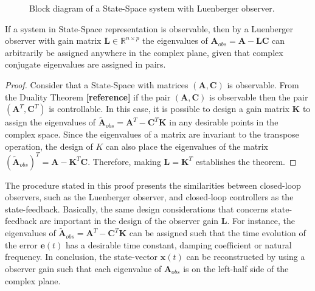 \documentclass[a4paper,11pt]{book}
\numberwithin{figure}{chapter}
\numberwithin{equation}{chapter}
\numberwithin{table}{chapter}
\newtheorem{theorem}{Theorem}[chapter]
\theoremstyle{definition}
\newcounter{boxed-theorem}
\newenvironment{boxed-theorem}[1]
{\begin{shaded} \begin{theorem}{#1}}
{\end{theorem} \end{shaded}}
\newcounter{boxed-definition}
\begin{document}
\begin{figure}[ht]
{ 
    }
    \caption{Block diagram of a State-Space system with Luenberger observer.}
    \label{fig:luenberger01}
\end{figure}

\begin{boxed-theorem}
    If a system in State-Space representation is observable, then by a Luenberger observer with gain matrix $\bm{L} \in \mathbb{R}^{n \times p}$ the eigenvalues of $\bm{A}_{obs} = \bm{A} - \bm{L} \bm{C}$ can arbitrarily be assigned anywhere in the complex plane, given that complex conjugate eigenvalues are assigned in pairs.
\end{boxed-theorem} 

\begin{proof}
    Consider that a State-Space with matrices $(\bm{A}, \bm{C})$ is observable. From the Duality Theorem \textbf{[reference]} if the pair $(\bm{A}, \bm{C})$ is observable then the pair $(\bm{A}^T, \bm{C}^T)$ is controllable. In this case, it is possible to design     a gain matrix $\bm{K}$ to assign the eigenvalues of $\tilde{\bm{A}}_{obs} = \bm{A}^T - \bm{C}^T \bm{K}$ in any desirable points in the complex space. Since the eigenvalues of a matrix are invariant to the transpose operation, the design of $K$ can also place the eigenvalues of the matrix $(\tilde{\bm{A}}_{obs})^T = \bm{A} - \bm{K}^T \bm{C}$. Therefore, making $\bm{L} = \bm{K}^T$ establishes the theorem.
\end{proof}

The procedure stated in this proof presents the similarities between closed-loop observers, such as the Luenberger observer, and closed-loop controllers as the state-feedback. Basically, the same design considerations that concerns state-feedback are important in the design of the observer gain $\bm{L}$. For instance, the eigenvalues of $\tilde{\bm{A}}_{obs} = \bm{A}^T - \bm{C}^T \bm{K}$ can be assigned such that the time evolution of the error $\bm{e}(t)$ has a desirable time constant, damping coefficient or natural frequency. In conclusion, the state-vector $\bm{x}(t)$ can be reconstructed by using a observer gain such that each eigenvalue of $\bm{A}_{obs}$ is on the left-half side of the complex plane. 
\end{document}
